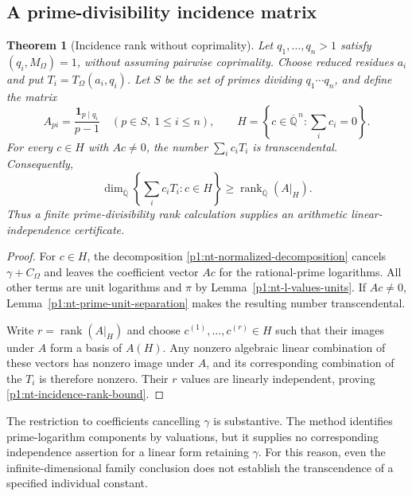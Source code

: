 \documentclass[11pt,a4paper]{article}
\newtheorem{theorem}{Theorem}[section]
\theoremstyle{definition}
\theoremstyle{remark}
\numberwithin{equation}{section}
\begin{document}
\subsection{A prime-divisibility incidence matrix}
\label{p1:nt-incidence-section}

\begin{theorem}[Incidence rank without coprimality]
\label{p1:nt-incidence-certificate}
Let $q_1,\ldots,q_n>1$ satisfy $(q_i,M_\Omega)=1$, without assuming
pairwise coprimality.  Choose reduced residues $a_i$ and put
$T_i=T_\Omega(a_i,q_i)$.  Let $S$ be the set of primes dividing
$q_1\cdots q_n$, and define the matrix
\[
 A_{p i}=\frac{\mathbf1_{p\mid q_i}}{p-1}
 \quad(p\in S,\ 1\le i\le n),
 \qquad
 H=\left\{c\in\overline{\mathbb Q}^{\,n}:\sum_i c_i=0\right\}.
\]
For every $c\in H$ with $Ac\ne0$, the number
$\sum_i c_iT_i$ is transcendental.  Consequently,
\begin{equation}
\label{p1:nt-incidence-rank-bound}
 \dim_{\overline{\mathbb Q}}
 \left\{\sum_i c_iT_i:c\in H\right\}
 \ge \operatorname{rank}_{\overline{\mathbb Q}}(A|_H).
\end{equation}
Thus a finite prime-divisibility rank calculation supplies an
arithmetic linear-independence certificate.
\end{theorem}

\begin{proof}
For $c\in H$, the decomposition
\eqref{p1:nt-normalized-decomposition} cancels $\gamma+C_\Omega$ and
leaves the coefficient vector $Ac$ for the rational-prime logarithms.
All other terms are unit logarithms and $\pi$ by
Lemma~\ref{p1:nt-l-values-units}.  If $Ac\ne0$,
Lemma~\ref{p1:nt-prime-unit-separation} makes the resulting number
transcendental.

Write $r=\operatorname{rank}(A|_H)$ and choose
$c^{(1)},\ldots,c^{(r)}\in H$ such that their images under $A$
form a basis of $A(H)$.  Any nonzero algebraic linear combination of
these vectors has nonzero image under $A$, and its corresponding
combination of the $T_i$ is therefore nonzero.  Their $r$ values are
linearly independent, proving \eqref{p1:nt-incidence-rank-bound}.
\end{proof}

The restriction to coefficients cancelling $\gamma$ is substantive.
The method identifies prime-logarithm components by valuations, but
it supplies no corresponding independence assertion for a linear
form retaining $\gamma$.  For this reason, even the infinite-dimensional
family conclusion does not establish the transcendence of a specified
individual constant.
\end{document}
